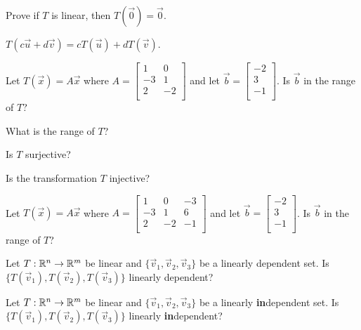\documentclass[12pt,letterpaper]{article}
\begin{document}
\begin{enumerate}

\Part Prove if $T$ is linear, then $T(\vec{0})=\vec{0}$.

\vfill 

\Part $T(c\vec{u}+d\vec{v})=cT(\vec{u})+dT(\vec{v})$.

\vfill

\Problem Let $T(\vec{x})=A\vec{x}$ where $A=\begin{bmatrix}
1 & 0\\
-3 & 1\\
2 & -2\\
\end{bmatrix}$ and let $\vec{b}=\begin{bmatrix}
-2\\3\\-1\\
\end{bmatrix}$. 
\Part Is $\vec{b}$ in the range of $T$?

\vfill

\Part What is the range of $T$?

\vfill

\newpage

\Part Is $T$ surjective?

\vfill

\Part Is the transformation $T$ injective?

\vfill

\newpage


\Problem Let $T(\vec{x})=A\vec{x}$ where $A=\begin{bmatrix}
1 & 0 &-3\\
-3 & 1 & 6\\
2 & -2 & -1\\
\end{bmatrix}$ and let $\vec{b}=\begin{bmatrix}
-2\\3\\-1\\
\end{bmatrix}$. Is $\vec{b}$ in the range of $T$?

\vfill

\Problem Let $T:\mathbb{R}^n \to \mathbb{R}^m$ be linear and $\{\vec{v}_1, \vec{v}_2,\vec{v}_3\}$ be a linearly dependent set. Is $\{T(\vec{v}_1), T(\vec{v}_2),T(\vec{v}_3)\}$ linearly dependent?

\vfill


\Problem Let $T:\mathbb{R}^n \to \mathbb{R}^m$ be linear and $\{\vec{v}_1, \vec{v}_2,\vec{v}_3\}$ be a linearly \textbf{in}dependent set.  Is $\{T(\vec{v}_1), T(\vec{v}_2),T(\vec{v}_3)\}$ linearly \textbf{in}dependent?



\vfill


\end{enumerate}
\end{document}

